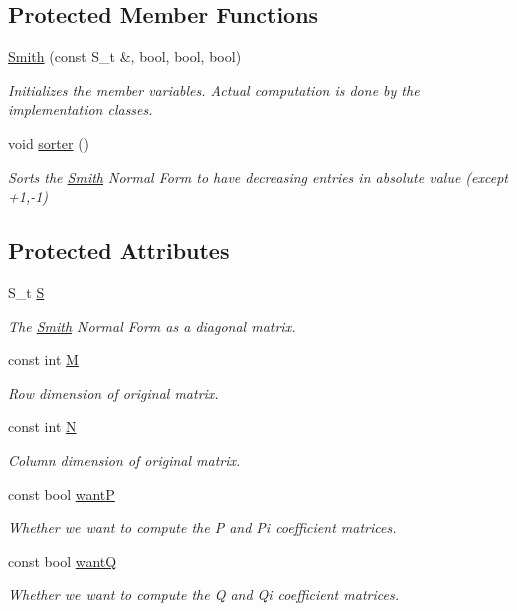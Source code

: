 \subsection*{Protected Member Functions}
\begin{DoxyCompactItemize}
\item 
\hyperlink{classMackey_1_1Smith_ab366b0cccb7fe065521142c442a0dcd3}{Smith} (const S\+\_\+t \&, bool, bool, bool)
\begin{DoxyCompactList}\small\item\em Initializes the member variables. Actual computation is done by the implementation classes. \end{DoxyCompactList}\item 
void \hyperlink{classMackey_1_1Smith_a30c76fbf9cb906c04908def480b0a321}{sorter} ()
\begin{DoxyCompactList}\small\item\em Sorts the \hyperlink{classMackey_1_1Smith}{Smith} Normal Form to have decreasing entries in absolute value (except +1,-\/1) \end{DoxyCompactList}\end{DoxyCompactItemize}
\subsection*{Protected Attributes}
\begin{DoxyCompactItemize}
\item 
S\+\_\+t \hyperlink{classMackey_1_1Smith_a2c4e977af966b2956354dce7e40dd5e1}{S}
\begin{DoxyCompactList}\small\item\em The \hyperlink{classMackey_1_1Smith}{Smith} Normal Form as a diagonal matrix. \end{DoxyCompactList}\item 
const int \hyperlink{classMackey_1_1Smith_aa651a3c122566df7847bec70583a5f48}{M}
\begin{DoxyCompactList}\small\item\em Row dimension of original matrix. \end{DoxyCompactList}\item 
const int \hyperlink{classMackey_1_1Smith_a642b4538712abcdcee8beb3f0ff08b89}{N}
\begin{DoxyCompactList}\small\item\em Column dimension of original matrix. \end{DoxyCompactList}\item 
const bool \hyperlink{classMackey_1_1Smith_a7033b338fda868e33f50950d2444ae75}{wantP}
\begin{DoxyCompactList}\small\item\em Whether we want to compute the P and Pi coefficient matrices. \end{DoxyCompactList}\item 
const bool \hyperlink{classMackey_1_1Smith_a10ec727132ca15eee9dac0522d617a50}{wantQ}
\begin{DoxyCompactList}\small\item\em Whether we want to compute the Q and Qi coefficient matrices. \end{DoxyCompactList}\end{DoxyCompactItemize}


